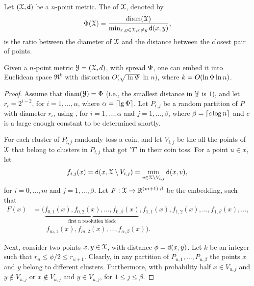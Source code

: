 Let $(\FMS,\DistChar)$ be a $n$-point metric. The  of $\FMS$,
denoted by
\begin{equation*}
    \Spread(\FMS)%
    =%
    \frac{\diam(\FMS)}{\min_{x,y \in \FMS, x \ne y} \DistChar(x,y)},
\end{equation*}
 is the ratio between the diameter of $\FMS$
and the distance between the closest pair of points.

\begin{theorem}
    Given a $n$-point metric $\FMSC = (\FMS,d)$, with spread
    $\Phi$, one can embed it into Euclidean space $\Re^k$ with
    distortion $O\bigl( \sqrt{\ln \Phi} \ln n\bigr)$, where
    $k= O \pth{ \ln \Phi \ln n}$.
\end{theorem}

\begin{proof}
    Assume that $\diam(\FMSC) = \Spread$ (i.e., the smallest distance
    in $\FMSC$ is $1$), and let $r_i = 2^{i-2}$, for $i=1,\ldots,
    \alpha$, where $\alpha=\left\lceil {\lg \Phi} \right\rceil$.  Let $P_{i,j}$ be a
    random partition of $P$ with diameter $r_i$, using
    , for $i=1,\ldots, \alpha$ and $j=1,\ldots, \beta$,
    where $\beta = \left\lceil { c \log n} \right\rceil$ and $c$ is a large enough
    constant to be determined shortly.
    
    For each cluster of $P_{i,j}$ randomly toss a coin, and let
    $V_{i,j}$ be the all the points of $\FMS$ that belong to clusters
    in $P_{i,j}$ that got '$T$' in their coin toss. For a point $u \in
    x$, let
    \begin{equation*}
        f_{i,j}(x)%
        =%
        \DistChar(x, \FMS \setminus V_{i,j})%
        =%
        \min_{v \in \FMS \setminus V_{i,j}} \DistChar(x,v),    
    \end{equation*}
    for $i=0,\ldots, m$
    and $j=1,\ldots, \beta$. Let $F: \FMS \rightarrow \Re^{(m+1) \cdot
       \beta}$ be the embedding, such that
    \begin{align*}
        F(x)%
        &=%
        \bigl(
        \underbrace{f_{0,1}(x), f_{0,2}(x), \ldots,
           f_{0,\beta}(x)}_{\text{first n resolution block}},
        f_{1,1}(x),
        f_{1,2}(x),
        \ldots, f_{1,\beta}(x), \ldots,
        \\&\qquad
        f_{m,1}(x), f_{m,2}(x), \ldots,
        f_{\alpha,\beta}(x)\bigr).
    \end{align*}

    
    Next, consider two points $x,y \in \FMS$, with distance $\phi=
    \mathsf{d}(x,y)$. Let $k$ be an integer such that $r_u \leq \phi/2 \leq
    r_{u+1}$. Clearly, in any partition of $P_{u,1}, \ldots,
    P_{u,\beta}$ the points $x$ and $y$ belong to different clusters.
    Furthermore, with probability half $x \in V_{u,j}$ and $y \notin
    V_{u,j}$ or $x \notin V_{u,j}$ and $y \in
    V_{u,j}$, for $1 \leq j \leq \beta$.
    

\end{proof}
